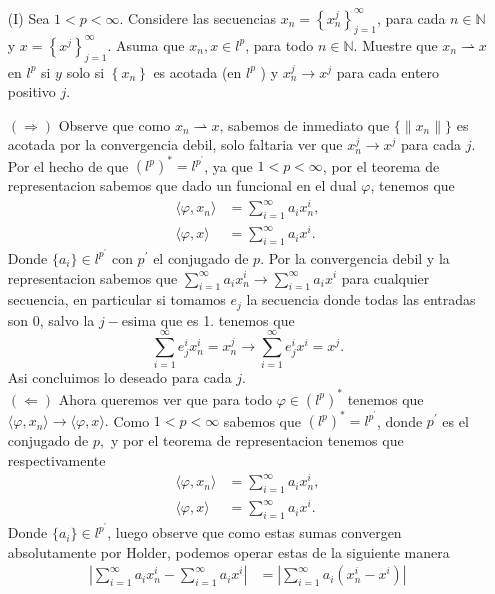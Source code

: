 \begin{itemize}
  \item[(I)] Sea $1<p<\infty$. Considere las secuencias $x_n=\left\{x_n^j\right\}_{j=1}^{\infty}$, para cada $n \in \mathbb{N}$ y $x=\left\{x^j\right\}_{j=1}^{\infty}$. Asuma que $x_n, x \in l^p$, para todo $n \in \mathbb{N}$.
  Muestre que $x_n \rightharpoonup x$ en $l^p$ si $y$ solo si $\left\{x_n\right\}$ es acotada (en $l^p$ ) y $ x_n^j \rightarrow x^j$ para cada entero positivo $j$.
  \begin{sproof}
    $(\Rightarrow)$ Observe que como $x_n\rightharpoonup x$, sabemos de inmediato que $\{\|x_n\|\}$ es acotada por la convergencia debil, solo faltaria ver que $x_n^j\to x^j$ para cada $j.$ Por el hecho de que $(l^p)^*=l^{p^\prime}$, ya que $1<p<\infty$, por el teorema de representacion sabemos que dado un funcional en el dual $\varphi$, tenemos que
    \begin{align*}
       \langle\varphi,x_n\rangle&=\sum_{i=1}^\infty a_ix_n^i,\\
       \langle\varphi,x\rangle&=\sum_{i=1}^\infty a_ix^i.
     \end{align*} 
     Donde $\{a_i\}\in l^{p^\prime}$ con $p^\prime$ el conjugado de $p$. Por la convergencia debil y la representacion sabemos que $\sum_{i=1}^\infty a_ix_n^i\to\sum_{i=1}^\infty a_ix^i$ para cualquier secuencia, en particular si tomamos $e_j$ la secuencia donde todas las entradas son 0, salvo la $j-$esima que es 1. tenemos que 
     $$\sum_{i=1}^\infty e_j^ix_n^i=x_n^j\to\sum_{i=1}^\infty e_j^ix^i=x^j.$$
     Asi concluimos lo deseado para cada $j.$\\
     $(\Leftarrow)$ Ahora queremos ver que para todo $\varphi\in (l^p)^*$ tenemos que $\langle\varphi,x_n\rangle\to\langle\varphi,x\rangle.$ Como $1<p<\infty$ sabemos que $(l^p)^*=l^{p^\prime}$, donde $p^\prime$ es el conjugado de $p,$ y por el teorema de representacion tenemos que respectivamente 
     \begin{align*}
       \langle\varphi,x_n\rangle&=\sum_{i=1}^\infty a_ix_n^i,\\
       \langle\varphi,x\rangle&=\sum_{i=1}^\infty a_ix^i.
     \end{align*} 
     Donde $\{a_i\}\in l^{p^\prime}$, luego observe que como estas sumas convergen absolutamente por Holder, podemos operar estas de la siguiente manera
     \begin{align*}
       \left|\sum_{i=1}^\infty a_ix_n^i-\sum_{i=1}^\infty a_ix^i\right|&=\left|\sum_{i=1}^\infty a_i(x_n^i-x^i)\right|\\

\end{align*}
\end{sproof}
\end{itemize}
